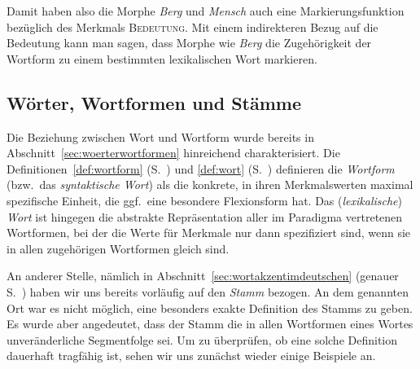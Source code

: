 \begin{exe}
  \ex\label{ex:morph0815}
  \begin{xlist}
  \end{xlist}
\end{exe}

Damit haben also die Morphe \textit{Berg} und \textit{Mensch} auch eine Markierungsfunktion bezüglich des Merkmals \textsc{Bedeutung}.
Mit einem indirekteren Bezug auf die Bedeutung kann man sagen, dass Morphe wie \textit{Berg} die Zugehörigkeit der Wortform zu einem bestimmten lexikalischen Wort markieren.

\subsection{Wörter, Wortformen und Stämme}

\label{sec:stamm}


Die Beziehung zwischen Wort und Wortform wurde bereits in Abschnitt~\ref{sec:woerterwortformen} hinreichend charakterisiert.
Die Definitionen~\ref{def:wortform} (S.~\pageref{def:wortform}) und \ref{def:wort} (S.~\pageref{def:wort}) definieren die \textit{Wortform} (bzw.\ das \textit{syntaktische Wort}) als die konkrete, in ihren Merkmalswerten maximal spezifische Einheit, die ggf.\ eine besondere Flexionsform hat.
Das (\textit{lexikalische}) \textit{Wort} ist hingegen die abstrakte Repräsentation aller im Paradigma vertretenen Wortformen, bei der die Werte für Merkmale nur dann spezifiziert sind, wenn sie in allen zugehörigen Wortformen gleich sind.

An anderer Stelle, nämlich in Abschnitt~\ref{sec:wortakzentimdeutschen} (genauer S.~\pageref{abs:3453457}) haben wir uns bereits vorläufig auf den \textit{Stamm} bezogen.
An dem genannten Ort war es nicht möglich, eine besonders exakte Definition des Stamms zu geben.
Es wurde aber angedeutet, dass der Stamm die in allen Wortformen eines Wortes unveränderliche Segmentfolge sei.
Um zu überprüfen, ob eine solche Definition dauerhaft tragfähig ist, sehen wir uns zunächst wieder einige Beispiele an.

